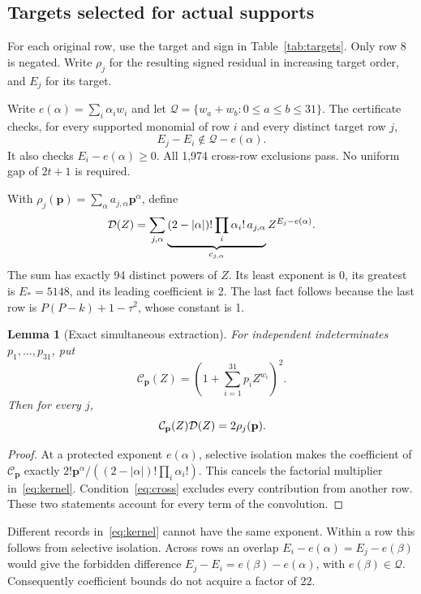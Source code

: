 \documentclass[11pt,letterpaper]{article}
\newtheorem{lemma}[theorem]{Lemma}
\theoremstyle{definition}\newtheorem{definition}[theorem]{Definition}
\begin{document}
\subsection{Targets selected for actual supports}
For each original row, use the target and sign in Table~\ref{tab:targets}.
Only row 8 is negated. Write $\rho_j$ for the resulting signed residual
in increasing target order, and $E_j$ for its target.


Write $e(\alpha)=\sum_i\alpha_iw_i$ and let
$\mathcal Q=\{w_a+w_b:0\le a\le b\le31\}$.
The certificate checks, for every supported monomial of row $i$ and
every distinct target row $j$,
\begin{equation}
E_j-E_i\notin\mathcal Q-e(\alpha).
\label{eq:cross}
\end{equation}
It also checks $E_i-e(\alpha)\ge0$. All 1,974 cross-row exclusions pass.
No uniform gap of $2t+1$ is required.

With $\rho_j(\mathbf p)=\sum_\alpha a_{j,\alpha}\mathbf p^\alpha$, define
\begin{equation}
\mathcal D(Z)=\sum_{j,\alpha}
\underbrace{(2-|\alpha|)!\prod_i\alpha_i!\,a_{j,\alpha}}_{c_{j,\alpha}}
Z^{E_j-e(\alpha)}.
\label{eq:kernel}
\end{equation}
The sum has exactly 94 distinct powers of $Z$. Its least exponent is 0,
its greatest is $E_*=5148$, and its leading coefficient is 2.
The last fact follows because the last row is
$P(P-k)+1-\tau^2$, whose constant is 1.

\begin{lemma}[Exact simultaneous extraction]
For independent indeterminates $p_1,\ldots,p_{31}$, put
\[
\mathcal C_{\mathbf p}(Z)=\left(1+\sum_{i=1}^{31}p_iZ^{w_i}\right)^2.
\]
Then for every $j$,
\begin{equation}
[Z^{E_j}]\,\mathcal C_{\mathbf p}(Z)\Dc(Z)=2\rho_j(\mathbf p).
\label{eq:extract}
\end{equation}
\end{lemma}
\begin{proof}
At a protected exponent $e(\alpha)$, selective isolation makes the
coefficient of $\mathcal C_{\mathbf p}$ exactly
$2!\mathbf p^\alpha/((2-|\alpha|)!\prod_i\alpha_i!)$.
This cancels the factorial multiplier in~\eqref{eq:kernel}.
Condition~\eqref{eq:cross} excludes every contribution from another row.
These two statements account for every term of the convolution.
\end{proof}

Different records in~\eqref{eq:kernel} cannot have the same exponent.
Within a row this follows from selective isolation. Across rows an overlap
$E_i-e(\alpha)=E_j-e(\beta)$ would give the forbidden difference
$E_j-E_i=e(\beta)-e(\alpha)$, with $e(\beta)\in\mathcal Q$.
Consequently coefficient bounds do not acquire a factor of 22.
\end{document}
